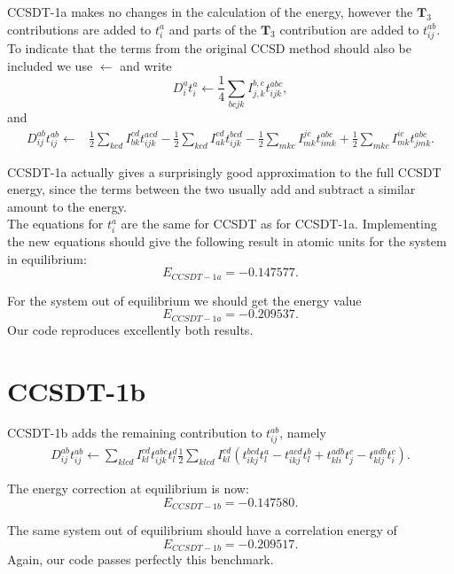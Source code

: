 CCSDT-1a makes no changes in the calculation of the energy, however
the $\textbf{T}_3$ contributions are added to $t_i^a$ and parts of the
$\textbf{T}_3$ contribution are added to $t_{ij}^{ab}$. To indicate
that the terms from the original CCSD method should also be included
we use $\leftarrow$ and write
\begin{equation}
D_i^a t_i^a \leftarrow \frac{1}{4} \sum_{bcjk}  I_{j,k}^{b,c} t_{ijk}^{abc},
\end{equation}
and
\begin{align}
D_{ij}^{ab} t_{ij}^{ab} \leftarrow & 
\frac{1}{2} \sum_{kcd} I_{bk}^{cd} t_{ijk}^{acd}
- \frac{1}{2} \sum_{kcd} I_{ak}^{cd} t_{ijk}^{bcd} - \frac{1}{2} \sum_{mkc} I_{mk}^{jc} t_{imk}^{abc} + \frac{1}{2} \sum_{mkc} I_{mk}^{ic} t_{jmk}^{abc} .
\end{align}

CCSDT-1a actually gives a surprisingly good approximation to the full
CCSDT energy, since the terms between the two usually add and subtract
a similar amount to the energy. \\

The equations for $t_i^a$ are the same for CCSDT as for CCSDT-1a. Implementing the new equations should give the following result in atomic units for the system in equilibrium:
\begin{equation}
E_{CCSDT-1a} = -0.147577 .
\end{equation}

For the system out of equilibrium we should get the energy value
\begin{equation}
E_{CCSDT-1a} = -0.209537 .
\end{equation}
Our code reproduces excellently both results.
\section{CCSDT-1b}
CCSDT-1b adds the remaining contribution to $t_{ij}^{ab}$, namely
\begin{align}
D_{ij}^{ab} t_{ij}^{ab} \leftarrow
\sum_{klcd} I_{kl}^{cd} t_{ijk}^{abc} t_l^d  \frac{1}{2} \sum_{klcd} I_{kl}^{cd} \left(
 t_{ikj}^{bcd} t_l^a - t_{ikj}^{acd} t_l^b 
 + t_{kli}^{adb} t_j^c - t_{klj}^{adb} t_i^c \right) .
\end{align}

The energy correction at equilibrium is now:
\begin{equation} 
E_{CCSDT-1b} = -0.147580 .
\end{equation}

The same system out of equilibrium should have a correlation energy of
\begin{equation}
E_{CCSDT-1b} = -0.209517  .
\end{equation}
Again, our code passes perfectly this benchmark. 
